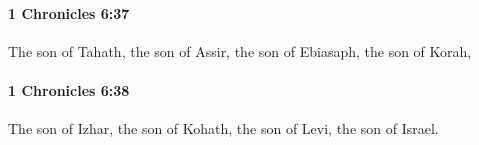 		\paragraph{1 Chronicles 6:37} %
			\label{1CHRONICLES-6-37}

			The son of Tahath, the son of Assir, the son of Ebiasaph, the son of Korah,


		\paragraph{1 Chronicles 6:38} %
			\label{1CHRONICLES-6-38}

			The son of Izhar, the son of Kohath, the son of Levi, the son of Israel.


